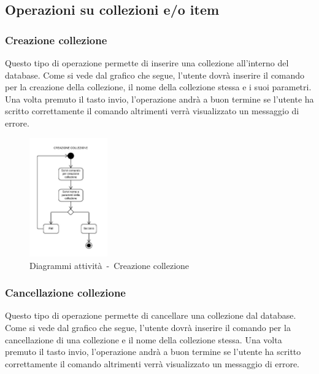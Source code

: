 \documentclass{scalatekids-article}
\begin{document}
\subsection{Operazioni su collezioni e/o item}
\subsubsection{Creazione collezione}

Questo tipo di operazione permette di inserire una collezione all'interno del
database. Come si vede dal grafico che segue, l'utente dovrà inserire il
comando per la creazione della collezione, il nome della collezione stessa e i
suoi parametri. Una volta premuto il tasto invio, l'operazione andrà a buon
termine se l'utente ha scritto correttamente il comando altrimenti verrà
visualizzato un messaggio di errore.

\begin{figure}[H]
  \begin{center}
    \includegraphics[width=0.3\textwidth, keepaspectratio]{img/diagrammiAttivita/creazioneCollezione.jpeg}
    \caption{Diagrammi attività\ -\ Creazione collezione}
  \end{center}
\end{figure}

\subsubsection{Cancellazione collezione}

Questo tipo di operazione permette di cancellare una collezione dal database.
Come si vede dal grafico che segue, l'utente dovrà inserire il comando per la
cancellazione di una collezione e il nome della collezione stessa. Una volta
premuto il tasto invio, l'operazione andrà a buon termine se l'utente ha
scritto correttamente il comando altrimenti verrà visualizzato un messaggio di
errore.
\end{document}
